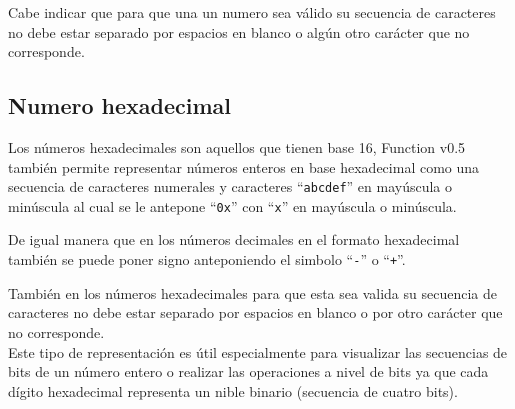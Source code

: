       \begin{fxcode}
      \end{fxcode}
      
      Cabe indicar que para que una un numero sea válido su secuencia de caracteres no debe estar separado por espacios en blanco o algún otro carácter que no corresponde.
      
      \subsection{Numero hexadecimal}
      Los números hexadecimales son aquellos que tienen base 16, Function v0.5 también permite representar números enteros en base hexadecimal como una secuencia de caracteres numerales y caracteres ``\texttt{abcdef}'' en mayúscula o minúscula al cual se le antepone ``\texttt{0x}'' con ``\texttt{x}'' en mayúscula o minúscula.\\
      
      \begin{fxcode}
          
      \end{fxcode}
      
      \begin{fxcode}
      \end{fxcode}
      
      De igual manera que en los números decimales en el formato hexadecimal también se puede poner signo anteponiendo el simbolo ``\texttt{-}'' o ``\texttt{+}''.\\
      
      \begin{fxcode}
      \end{fxcode}
      
      También en los números hexadecimales para que esta sea valida su secuencia de caracteres no debe estar separado por espacios en blanco o por otro carácter que no corresponde.\\
      
      Este tipo de representación es útil especialmente para visualizar las secuencias de bits de un número entero o realizar las operaciones a nivel de bits ya que cada dígito hexadecimal representa un nible binario (secuencia de cuatro bits).\\
      
